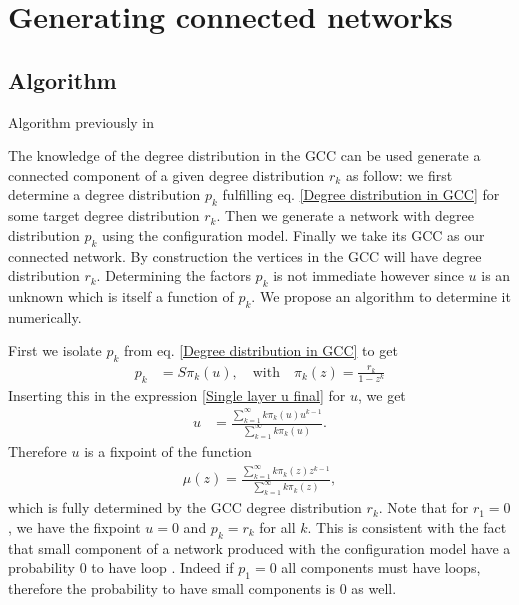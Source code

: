 \documentclass[
11pt, %
english, %
singlespacing, %
nolistspacing, %
liststotoc, %
headsepline, %
]{MastersDoctoralThesis} %
\begin{document}
\section{Generating connected networks}
\label{Section: Generating connected networks}

\subsection{Algorithm}

Algorithm previously in \cite{bialas2008correlations} 

The knowledge of the degree distribution in the GCC can be used generate a connected component of a given degree distribution $r_k$ as follow: we first determine a degree distribution $p_k$ fulfilling eq. \eqref{Degree distribution in GCC} for some target degree distribution $r_k$. Then we generate a network with degree distribution $p_k$ using the configuration model. Finally we take its GCC as our connected network. By construction the vertices in the GCC will have degree distribution $r_k$. Determining the factors $p_k$ is not immediate however since $u$ is an unknown which is itself a function of $p_k$. We propose an algorithm to determine it numerically.

First we isolate $p_k$ from eq. \eqref{Degree distribution in GCC} to get
\begin{align}
	p_k &= S \pi_k(u), \quad \text{with} \quad \pi_k(z) = \frac{r_k}{1 - z^k}
\end{align}
Inserting this in the expression \eqref{Single layer u final} for $u$, we get
\begin{align}
	u &= \frac{\sum_{k=1}^\infty k \pi_k(u) u^{k-1}}{\sum_{k=1}^\infty k \pi_k(u)}. \label{Fixpoint equation for u}
\end{align}
Therefore $u$ is a fixpoint of the function
\begin{align}
	\mu(z) = \frac{\sum_{k=1}^\infty k \pi_k(z) z^{k-1}}{\sum_{k=1}^\infty k \pi_k(z)}, \label{Defition of mu}
\end{align}
which is fully determined by the GCC degree distribution $r_k$. Note that for $r_1 = 0$, we have the fixpoint $u = 0$ and $p_k = r_k$ for all $k$. This is consistent with the fact that small component of a network produced with the configuration model have a probability $0$ to have loop \cite{newman2010networks}. Indeed if $p_1 = 0$ all components must have loops, therefore the probability to have small components is $0$ as well.
\end{document}
